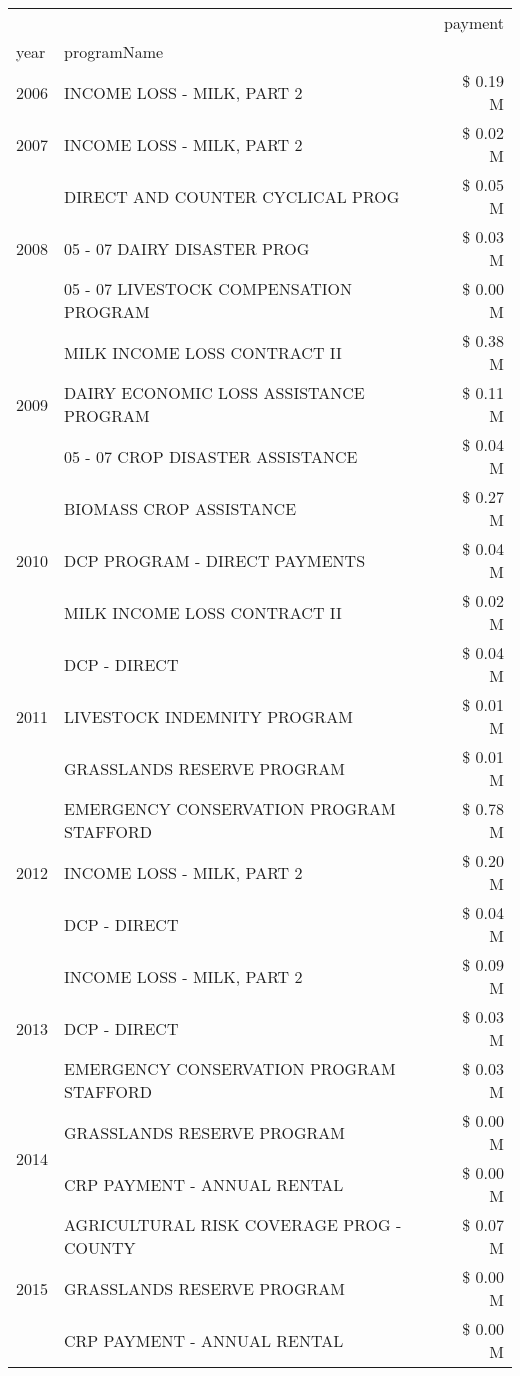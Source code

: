 \begin{tabular}{llr}
\toprule
 &  & payment \\
year & programName &  \\
\midrule
2006 & INCOME LOSS - MILK, PART 2 & \$ 0.19 M \\
\cline{1-3}
2007 & INCOME LOSS - MILK, PART 2 & \$ 0.02 M \\
\cline{1-3}
\multirow[t]{3}{*}{2008} & DIRECT AND COUNTER CYCLICAL PROG & \$ 0.05 M \\
 & 05 - 07 DAIRY DISASTER PROG & \$ 0.03 M \\
 & 05 - 07 LIVESTOCK COMPENSATION PROGRAM & \$ 0.00 M \\
\cline{1-3}
\multirow[t]{3}{*}{2009} & MILK INCOME LOSS CONTRACT II & \$ 0.38 M \\
 & DAIRY ECONOMIC LOSS ASSISTANCE PROGRAM & \$ 0.11 M \\
 & 05 - 07 CROP DISASTER ASSISTANCE & \$ 0.04 M \\
\cline{1-3}
\multirow[t]{3}{*}{2010} & BIOMASS CROP ASSISTANCE & \$ 0.27 M \\
 & DCP PROGRAM - DIRECT PAYMENTS & \$ 0.04 M \\
 & MILK INCOME LOSS CONTRACT II & \$ 0.02 M \\
\cline{1-3}
\multirow[t]{3}{*}{2011} & DCP - DIRECT & \$ 0.04 M \\
 & LIVESTOCK INDEMNITY PROGRAM & \$ 0.01 M \\
 & GRASSLANDS RESERVE PROGRAM & \$ 0.01 M \\
\cline{1-3}
\multirow[t]{3}{*}{2012} & EMERGENCY CONSERVATION PROGRAM STAFFORD & \$ 0.78 M \\
 & INCOME LOSS - MILK, PART 2 & \$ 0.20 M \\
 & DCP - DIRECT & \$ 0.04 M \\
\cline{1-3}
\multirow[t]{3}{*}{2013} & INCOME LOSS - MILK, PART 2 & \$ 0.09 M \\
 & DCP - DIRECT & \$ 0.03 M \\
 & EMERGENCY CONSERVATION PROGRAM STAFFORD & \$ 0.03 M \\
\cline{1-3}
\multirow[t]{2}{*}{2014} & GRASSLANDS RESERVE PROGRAM & \$ 0.00 M \\
 & CRP PAYMENT - ANNUAL RENTAL & \$ 0.00 M \\
\cline{1-3}
\multirow[t]{3}{*}{2015} & AGRICULTURAL RISK COVERAGE PROG - COUNTY & \$ 0.07 M \\
 & GRASSLANDS RESERVE PROGRAM & \$ 0.00 M \\
 & CRP PAYMENT - ANNUAL RENTAL & \$ 0.00 M \\

\end{tabular}
